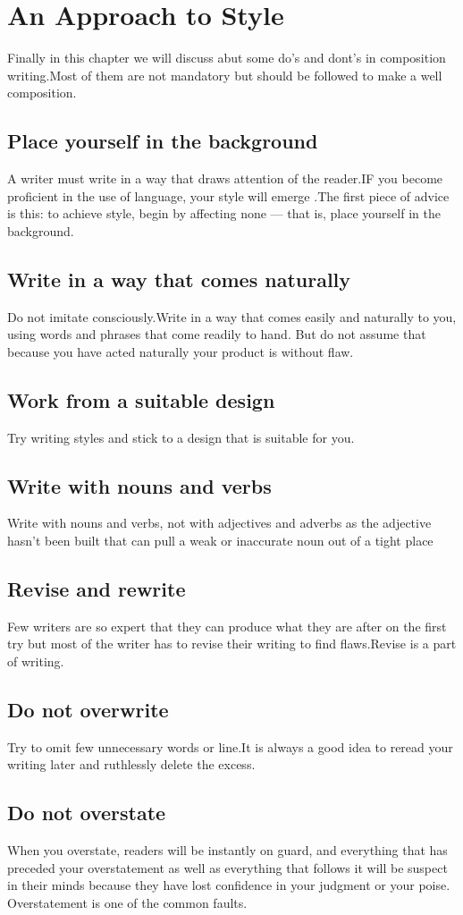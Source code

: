 \documentclass{report}
\begin{document}
\chapter{An Approach to Style}\label{sec:Approach to style}
Finally in this chapter  we will discuss abut some do's and dont's in composition writing.Most of them are not mandatory but should be followed to make a well composition.
\section{Place yourself in the background}
A writer must write in a way that draws attention of the reader.IF you become proficient in the use of language, your style will emerge .The first piece of advice is this: to achieve style, begin by affecting none — that is, place yourself in the background.
\section{Write in a way that comes naturally}
Do not imitate consciously.Write in a way that comes easily and naturally to you, using words and phrases that come readily to hand. But do not assume that because you have acted naturally your product is without flaw.
\section{Work from a suitable design}
Try writing styles and stick to a design that is suitable for you.
\section{Write with nouns and verbs}
Write with nouns and verbs, not with adjectives and adverbs as the adjective hasn't been built that can pull a weak or inaccurate noun out of a tight place
\section{Revise and rewrite}
 Few writers are so expert that they can produce what they are after on the first try but most of the writer has to revise their writing to find flaws.Revise is a part of writing.
\section{ Do not overwrite}
Try to omit few unnecessary words or line.It is always a good idea to reread your writing later and ruthlessly delete the excess.
\section{Do not overstate}
When you overstate, readers will be instantly on guard, and everything that has preceded your overstatement as well as everything that follows it will be suspect in their minds because they have lost confidence in your judgment or your poise. Overstatement is one of the common faults.
\end{document}
